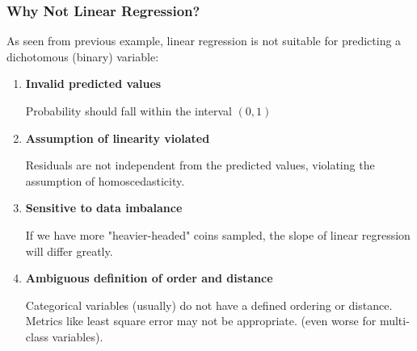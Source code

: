 \documentclass[10pt,aspectratio=169]{beamer}
\begin{document}
\begin{frame}
  \frametitle{Why Not Linear Regression?}
  As seen from previous example, linear regression is not
  suitable for predicting a dichotomous (binary) variable:

  \begin{enumerate}
    \vfill \item \textbf{Invalid predicted values}

    Probability should fall within the interval $(0, 1)$
  
    \vfill \item \textbf{Assumption of linearity violated}

    Residuals are not independent from the predicted values, violating
    the assumption of homoscedasticity.


  
    \vfill \item \textbf{Sensitive to data imbalance}

    If we have more "heavier-headed" coins sampled, the slope of
    linear regression will differ greatly.

    
    \vfill \item \textbf{Ambiguous definition of order and distance}

    Categorical variables (usually) do not have a defined ordering or
    distance. Metrics like least square error may not be appropriate.
    (even worse for multi-class variables).
    
  \end{enumerate}
\end{frame}
\end{document}
